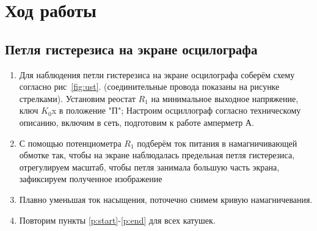 \documentclass[14pt,a4paper]{article}
\begin{document}
\newpage
\section*{Ход работы}
\subsection*{Петля гистерезиса на экране осцилографа}
\begin{enumerate}
  \item Для наблюдения петли гистерезиса на экране осцилографа соберём схему согласно рис~\ref{fig:ust}. (соединительные провода показаны на рисунке стрелками).
  Установим реостат $R_1$ на минимальное выходное напряжение, ключ $K_0$x в положение "П";
  Настроим осциллограф согласно техническому описанию, включим в сеть, подготовим к работе амперметр А.
  \item \label{p:start} С помощью потенциометра $R_1$ подберём ток питания в намагничивающей обмотке так, чтобы на экране наблюдалась предельная петля гистерезиса, отрегулируем масштаб, чтобы петля занимала большую часть экрана, зафиксируем полученное изображение
  \item\label{p:end} Плавно уменьшая ток насыщения, поточечно снимем кривую намагничевания.
  \item Повторим пункты \ref{p:start}-\ref{p:end} для всех катушек.
\end{enumerate}
\end{document}
